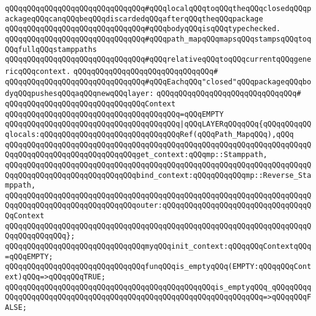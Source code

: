 \verb|qQQqqQQqqQQqqQQqqQQqqQQqqQQqqQQq#qQQqlocalqQQqtoqQQqtheqQQqclosedqQQqpackageqQQqcanqQQqbeqQQqdiscardedqQQqafterqQQqtheqQQqpackage|\newline
\verb|qQQqqQQqqQQqqQQqqQQqqQQqqQQqqQQq#qQQqbodyqQQqisqQQqtypechecked.|\newline
\newline
\newline
\verb|qQQqqQQqqQQqqQQqqQQqqQQqqQQqqQQq#qQQqpath_mapqQQqmapsqQQqstampsqQQqtoqQQqfullqQQqstamppaths|\newline
\verb|qQQqqQQqqQQqqQQqqQQqqQQqqQQqqQQq#qQQqrelativeqQQqtoqQQqcurrentqQQqgenericqQQqcontext.|\newline
\verb|qQQqqQQqqQQqqQQqqQQqqQQqqQQqqQQq#|\newline
\verb|qQQqqQQqqQQqqQQqqQQqqQQqqQQqqQQq#qQQqEachqQQq"closed"qQQqpackageqQQqbodyqQQqpushesqQQqaqQQqnewqQQqlayer:|\newline
\verb|qQQqqQQqqQQqqQQqqQQqqQQqqQQqqQQq#|\newline
\verb|qQQqqQQqqQQqqQQqqQQqqQQqqQQqqQQqContext|\newline
\verb|qQQqqQQqqQQqqQQqqQQqqQQqqQQqqQQqqQQqqQQq=qQQqEMPTY|\newline
\verb|qQQqqQQqqQQqqQQqqQQqqQQqqQQqqQQqqQQqqQQq|\verb#|qQQqLAYERqQQqqQQq{qQQqqQQqqQQqlocals:qQQqqQQqqQQqqQQqqQQqqQQqqQQqqQQqRef(qQQqPath_MapqQQq),qQQq#\newline
\verb|qQQqqQQqqQQqqQQqqQQqqQQqqQQqqQQqqQQqqQQqqQQqqQQqqQQqqQQqqQQqqQQqqQQqqQQqqQQqqQQqqQQqqQQqqQQqqQQqqQQqget_context:qQQqmp::Stamppath,|\newline
\verb|qQQqqQQqqQQqqQQqqQQqqQQqqQQqqQQqqQQqqQQqqQQqqQQqqQQqqQQqqQQqqQQqqQQqqQQqqQQqqQQqqQQqqQQqqQQqqQQqqQQqbind_context:qQQqqQQqqQQqmp::Reverse_Stamppath,|\newline
\verb|qQQqqQQqqQQqqQQqqQQqqQQqqQQqqQQqqQQqqQQqqQQqqQQqqQQqqQQqqQQqqQQqqQQqqQQqqQQqqQQqqQQqqQQqqQQqqQQqqQQqouter:qQQqqQQqqQQqqQQqqQQqqQQqqQQqqQQqqQQqContext|\newline
\verb|qQQqqQQqqQQqqQQqqQQqqQQqqQQqqQQqqQQqqQQqqQQqqQQqqQQqqQQqqQQqqQQqqQQqqQQqqQQqqQQqqQQq};|\newline
\newline
\verb|qQQqqQQqqQQqqQQqqQQqqQQqqQQqqQQqmyqQQqinit_context:qQQqqQQqContextqQQq=qQQqEMPTY;|\newline
\newline
\verb|qQQqqQQqqQQqqQQqqQQqqQQqqQQqqQQqfunqQQqis_emptyqQQq(EMPTY:qQQqqQQqContext)qQQq=>qQQqqQQqTRUE;|\newline
\verb|qQQqqQQqqQQqqQQqqQQqqQQqqQQqqQQqqQQqqQQqqQQqqQQqis_emptyqQQq_qQQqqQQqqQQqqQQqqQQqqQQqqQQqqQQqqQQqqQQqqQQqqQQqqQQqqQQqqQQqqQQqqQQq=>qQQqqQQqFALSE;|\newline
